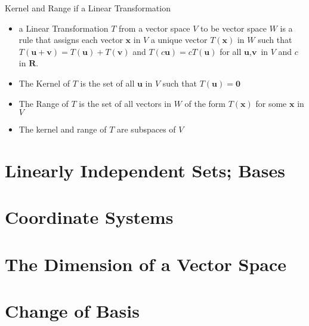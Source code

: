 \documentclass[../linalg.tex]{subfiles}
\begin{document}
Kernel and Range if a Linear Transformation
\begin{itemize}
    \item a Linear Transformation $T$ from a vector space $V$ to be vector space $W$ is a rule that assigns each vector $\textbf{x}$ in $V$ a unique vector $T(\textbf{x})$ in $W$ such that $T(\textbf{u}+\textbf{v})=T(\textbf{u})+T(\textbf{v})$ and 
    $T(c\textbf{u})=cT(\textbf{u})$ for all $\textbf{u},\textbf{v}$ in $V$ and $c$ in $\textbf{R}$.
    \item The Kernel of $T$ is the set of all $\textbf{u}$ in $V$ such that $T(\textbf{u})=\textbf{0}$ 
    \item The Range of $T$ is the set of all vectors in $W$ of the form $T(\textbf{x})$ for some $\textbf{x}$ in $V$
    \item The kernel and range of $T$ are subspaces of $V$
\end{itemize}



\section{Linearly Independent Sets; Bases}
\section{Coordinate Systems}
\section{The Dimension of a Vector Space}
\section{Change of Basis}
\end{document}
